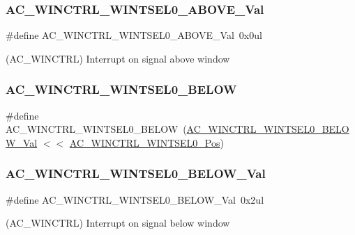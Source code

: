 \subsubsection{\texorpdfstring{AC\_WINCTRL\_WINTSEL0\_ABOVE\_Val}{AC\_WINCTRL\_WINTSEL0\_ABOVE\_Val}}
{\footnotesize\ttfamily \#define A\+C\+\_\+\+W\+I\+N\+C\+T\+R\+L\+\_\+\+W\+I\+N\+T\+S\+E\+L0\+\_\+\+A\+B\+O\+V\+E\+\_\+\+Val~0x0ul}



(A\+C\+\_\+\+W\+I\+N\+C\+T\+RL) Interrupt on signal above window 

\mbox{\label{group___s_a_m_d21___a_c_ga6b64dbedae3525bbcbf2da4c53a8a2c7}} 
\subsubsection{\texorpdfstring{AC\_WINCTRL\_WINTSEL0\_BELOW}{AC\_WINCTRL\_WINTSEL0\_BELOW}}
{\footnotesize\ttfamily \#define A\+C\+\_\+\+W\+I\+N\+C\+T\+R\+L\+\_\+\+W\+I\+N\+T\+S\+E\+L0\+\_\+\+B\+E\+L\+OW~(\mbox{\hyperlink{group___s_a_m_d21___a_c_gab989630a135aae7f20d8d1161fae744a}{A\+C\+\_\+\+W\+I\+N\+C\+T\+R\+L\+\_\+\+W\+I\+N\+T\+S\+E\+L0\+\_\+\+B\+E\+L\+O\+W\+\_\+\+Val}} $<$$<$ \mbox{\hyperlink{group___s_a_m_d21___a_c_gaf7bc05aa7122fff6ea05ae690cbc8486}{A\+C\+\_\+\+W\+I\+N\+C\+T\+R\+L\+\_\+\+W\+I\+N\+T\+S\+E\+L0\+\_\+\+Pos}})}

\mbox{\label{group___s_a_m_d21___a_c_gab989630a135aae7f20d8d1161fae744a}} 
\subsubsection{\texorpdfstring{AC\_WINCTRL\_WINTSEL0\_BELOW\_Val}{AC\_WINCTRL\_WINTSEL0\_BELOW\_Val}}
{\footnotesize\ttfamily \#define A\+C\+\_\+\+W\+I\+N\+C\+T\+R\+L\+\_\+\+W\+I\+N\+T\+S\+E\+L0\+\_\+\+B\+E\+L\+O\+W\+\_\+\+Val~0x2ul}



(A\+C\+\_\+\+W\+I\+N\+C\+T\+RL) Interrupt on signal below window 

